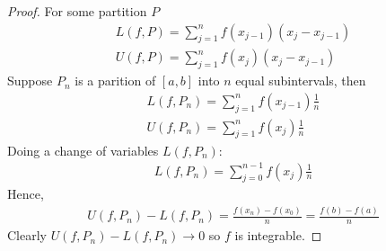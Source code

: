 \begin{proof}
    For some partition $P$ 
    \begin{gather*}
        L(f,P) = \sum_{j=1}^n f(x_{j-1})(x_j - x_{j-1}) \\
        U(f,P) = \sum_{j=1}^n f(x_{j})(x_j - x_{j-1})
    \end{gather*}
    Suppose $P_n$ is a parition of $[a,b]$ into $n$ equal subintervals, 
    then 
    \begin{gather*}
        L(f,P_n) = \sum_{j=1}^n f(x_{j-1})\frac{1}{n} \\
        U(f,P_n) = \sum_{j=1}^n f(x_{j})\frac{1}{n}
    \end{gather*}
    Doing a change of variables $L(f,P_n)$:
    \begin{gather*}
        L(f,P_n) = \sum_{j=0}^{n-1} f(x_{j})\frac{1}{n}
    \end{gather*}
    Hence, 
    \begin{align*}
        U(f,P_n) - L(f,P_n) = \frac{f(x_n) - f(x_0)}{n} = \frac{f(b) - f(a)}{n}
    \end{align*}
    Clearly $U(f,P_n) - L(f,P_n) \rightarrow 0$ so $f$ is integrable.
\end{proof}